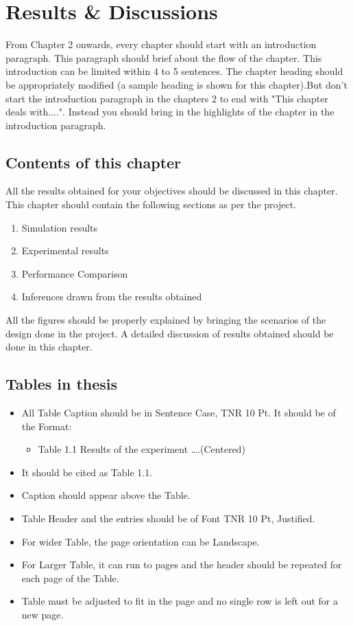 \chapter{Results \& Discussions}
\indent\indent From Chapter 2 onwards, every chapter should start with an introduction paragraph. This paragraph should brief about the flow of the chapter. This introduction can be limited within 4 to 5 sentences. The chapter heading should be appropriately modified (a sample heading is shown for this chapter).But don't start the introduction paragraph in the chapters 2 to end with "This chapter deals with....". Instead you should bring in the highlights of the chapter in the introduction paragraph.
\section{Contents of this chapter}
All the results obtained for your objectives should be discussed in this chapter. This chapter should contain the following sections as per the project.
\begin{enumerate}
\item Simulation results
\item Experimental results
\item Performance Comparison
\item Inferences drawn from the results obtained
\end{enumerate}
All the figures should be properly explained by bringing the scenarios of the design done in the project. A detailed discussion of results obtained should be done in this chapter.

\section{Tables in thesis}
\begin{itemize}
	\item All Table Caption should be in Sentence Case, TNR 10 Pt. It should be of the Format:
	\begin{itemize}
		\item Table 1.1 Results of the experiment ….(Centered)
	\end{itemize}
	\item It should be cited as Table 1.1.
	\item Caption should appear above the Table.
	\item Table Header and the entries should be of Font TNR 10 Pt, Justified.
	\item For wider Table, the page orientation can be Landscape.
	\item For Larger Table, it can run to pages and the header should be repeated for each page of the Table.
	\item Table must be adjusted to fit in the page and no single row is left out for a new page.	
\end{itemize}

